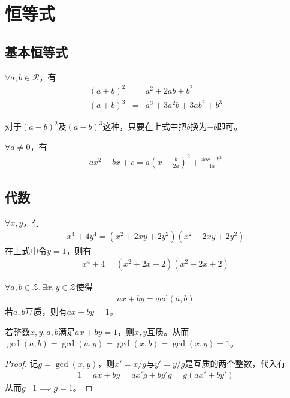 
\chapter{恒等式}
\label{chap:identities}

\section{基本恒等式}
\label{sec:basic-identities}

\begin{example}$\forall a,b\in\mathcal{R}$，有
  \begin{align*}
    (a + b)^2 &=& a^2 + 2ab + b^2\\
    (a + b)^3 &=& a^3 + 3a^2b + 3ab^2 + b^3
  \end{align*}
\end{example}
对于$(a-b)^2$及$(a-b)^3$这种，只要在上式中把$b$换为$-b$即可。

\begin{example}[配方]$\forall a\ne 0$，有
  \begin{align*}
    ax^2 + bx + c = a\left(x-\frac{b}{2a}\right)^2 + \frac{4ac - b^2}{4a}
  \end{align*}
\end{example}

\section{代数}
\label{sec:algebra-identities}

\begin{theorem}
  $\forall x,y$，有
  \begin{align*}
    x^4 + 4y^4 = (x^2 + 2xy + 2y^2)(x^2 - 2xy + 2y^2)
  \end{align*}
  在上式中令$y=1$，则有
  \begin{align*}
    x^4 + 4 = (x^2 + 2x + 2)(x^2 - 2x + 2)
  \end{align*}
\end{theorem}

\begin{theorem}\label{th:Bezout}
  $\forall a,b\in\mathcal{Z},\exists x,y\in\mathcal{Z}$使得
  \begin{align*}
    ax+by=\mathrm{gcd}(a,b)
  \end{align*}
  若$a,b$互质，则有$ax+by=1$。
\end{theorem}

\begin{theorem}\label{th:inverse-bezout}
  若整数$x,y,a,b$满足$ax+by=1$，则$x,y$互质。从而$\gcd(a,b)=\gcd(a,y)=\gcd(x,b)=\gcd(x,y)=1$。
\end{theorem}
\begin{proof}
  记$g=\gcd(x,y)$，则$x'=x/g$与$y'=y/g$是互质的两个整数，代入有
  \begin{align*}
    1=ax+by=ax'g+by'g=g(ax'+by')
  \end{align*}
  从而$g\mid 1\implies g=1$。
\end{proof}

